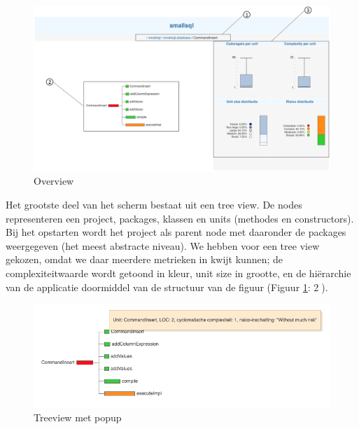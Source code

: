 \documentclass[a4paper]{article}
\begin{document}
\begin{figure}[h]
  \includegraphics[width=0.8\linewidth]{images/overview_with_numbers.png}
  \caption{Overview}
  \label{fig:overview}
\end{figure}
 
Het grootste deel van het scherm bestaat uit een tree view. De nodes representeren een project, packages, klassen en units (methodes en constructors). Bij het opstarten wordt het project als parent node met daaronder de packages weergegeven (het meest abstracte niveau). We hebben voor een tree view gekozen, omdat we daar meerdere metrieken in kwijt kunnen; de complexiteitwaarde wordt getoond in kleur, unit size in grootte, en de hiërarchie van de applicatie doormiddel van de structuur van de figuur (Figuur \ref{fig:overview}: \textcircled{2}). 
\begin{figure}[h]
  \includegraphics[width=\linewidth]{images/treeview_with_popup.png}
  \caption{Treeview met popup}
  \label{fig:treeview_popup}
\end{figure}
\end{document}
